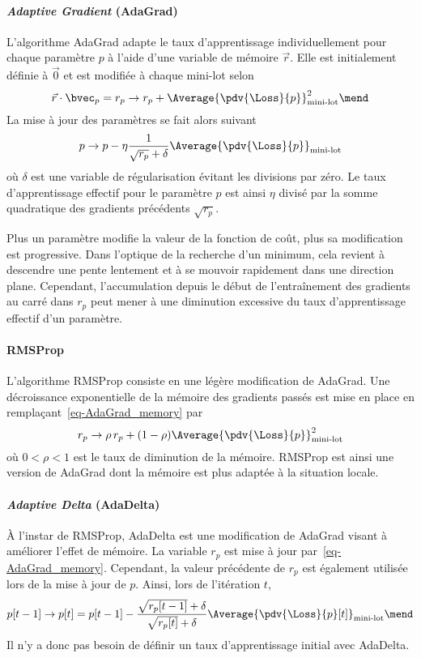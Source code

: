 \paragraph{\emph{Adaptive Gradient} (AdaGrad)} \cite{adagrad}
L'algorithme AdaGrad adapte le taux d'apprentissage individuellement pour chaque paramètre $p$
à l'aide d'une
variable de mémoire $\vec{r}$.
Elle est initialement définie à $\vec{0}$ et est modifiée à chaque mini-lot selon
\begin{equation}
\vec{r}\cdot\bvec_p = r_p \to r_p + \Average{\pdv{\Loss}{p}}_\text{mini-lot}^2
\label{eq-AdaGrad_memory}
\mend
\end{equation}
La mise à jour des paramètres se fait alors suivant
\begin{equation}
p \to p - \eta \frac{1}{\sqrt{r_p}+\delta} \Average{\pdv{\Loss}{p}}_\text{mini-lot}
\end{equation}
où $\delta$ est une variable de régularisation évitant les divisions par zéro.
Le taux d'apprentissage effectif pour le paramètre $p$
est ainsi $\eta$ divisé par la somme quadratique des gradients précédents $\sqrt{r_p}$.
\par
Plus un paramètre modifie la valeur de la fonction de coût, plus sa modification est progressive.
Dans l'optique de la recherche d'un minimum, cela revient à descendre une pente lentement et à se mouvoir rapidement dans une direction plane.
Cependant, l'accumulation depuis le début de l'entraînement des gradients au carré dans $r_p$ peut mener à une diminution excessive du taux d'apprentissage effectif d'un paramètre.
\paragraph{RMSProp} \cite{RMSProp}
L'algorithme RMSProp consiste en une légère modification de AdaGrad.
Une décroissance exponentielle de la mémoire des gradients passés est mise en place en remplaçant~\eqref{eq-AdaGrad_memory} par
\begin{equation}
r_p \to \rho \, r_p + (1-\rho)\Average{\pdv{\Loss}{p}}_\text{mini-lot}^2
\end{equation}
où $0<\rho<1$ est le taux de diminution de la mémoire.
RMSProp est ainsi une version de AdaGrad dont la mémoire est plus adaptée à la situation locale.
\paragraph{\emph{Adaptive Delta} (AdaDelta)}
À l'instar de RMSProp, AdaDelta est une modification de AdaGrad visant à améliorer l'effet de mémoire.
La variable $r_p$ est mise à jour par~\eqref{eq-AdaGrad_memory}.
Cependant, la valeur précédente de $r_p$ est également utilisée lors de la mise à jour de $p$.
Ainsi, lors de l'itération $t$,
\begin{equation}
p [t-1] \to p [t] = p[t-1] - \frac{\sqrt{r_p[t-1]}+\delta}{\sqrt{r_p[t]}+\delta} \Average{\pdv{\Loss}{p} [t]}_\text{mini-lot}
\mend
\end{equation}
Il n'y a donc pas besoin de définir un taux d'apprentissage initial avec AdaDelta.
